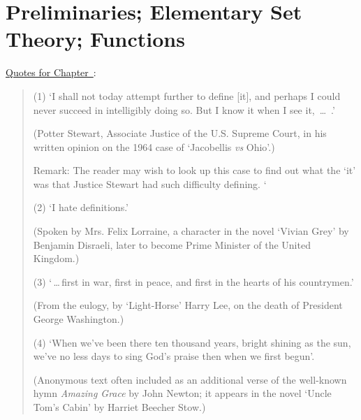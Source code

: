 
%
%



                  \chapter{Preliminaries; Elementary Set Theory; Functions}
                  \label{ChaptA}


        \underline{Quotes for Chapter~}:

\V

\begin{quotation}
{\footnotesize

        (1) `I shall not today attempt further to define [it], and perhaps I could never succeed in intelligibly doing so. But I know it when I see it, \,{\ldots}\, .'

        (Potter Stewart, Associate Justice of the U.S. Supreme Court, in his written opinion on the 1964 case of `Jacobellis {\em vs} Ohio'.)

        Remark: The reader may wish to look up this case to find out what the `it' was that Justice Stewart had such difficulty defining.
`
\V

        (2) `I hate definitions.'

        (Spoken by Mrs. Felix Lorraine, a character in the novel `Vivian Grey' by Benjamin Disraeli, later to become Prime Minister of the United Kingdom.)

\V

        (3) `\,{\ldots}\,first in war, first in peace, and first in the hearts of his countrymen.'

        (From the eulogy, by `Light-Horse' Harry Lee, on the death of President George Washington.)

\V

        (4) `When we've been there ten thousand years, bright shining as the sun, we've no less days to sing God's praise then when we first begun'.

        (Anonymous text often included as an additional verse of the well-known hymn {\em Amazing Grace} by John Newton;
    it appears in the novel `Uncle Tom's Cabin' by Harriet Beecher Stow.)

}%
\end{quotation}

